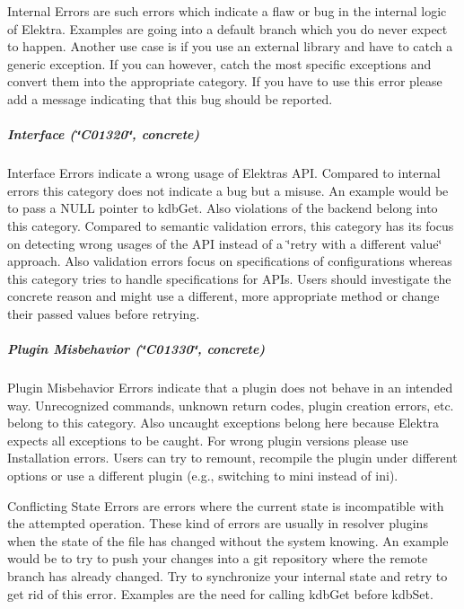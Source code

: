 {\ttfamily Internal Errors} are such errors which indicate a flaw or bug in the internal logic of Elektra. Examples are going into a {\ttfamily default} branch which you do never expect to happen. Another use case is if you use an external library and have to catch a generic exception. If you can however, catch the most specific exceptions and convert them into the appropriate category. If you have to use this error please add a message indicating that this bug should be reported.

\label{invalid_invalid}%
%
\subparagraph*{Interface (\char`\"{}\+C01320\char`\"{}, concrete)}

{\ttfamily Interface Errors} indicate a wrong usage of Elektra\textquotesingle{}s A\+PI. Compared to {\ttfamily internal} errors this category does not indicate a bug but a misuse. An example would be to pass a N\+U\+LL pointer to {\ttfamily kdb\+Get}. Also violations of the backend belong into this category. Compared to semantic validation errors, this category has its focus on detecting wrong usages of the A\+PI instead of a \char`\"{}retry with a
different value\char`\"{} approach. Also validation errors focus on specifications of configurations whereas this category tries to handle specifications for A\+P\+Is. Users should investigate the concrete reason and might use a different, more appropriate method or change their passed values before retrying.

\label{invalid_invalid}%
%
\subparagraph*{Plugin Misbehavior (\char`\"{}\+C01330\char`\"{}, concrete)}

{\ttfamily Plugin Misbehavior Errors} indicate that a plugin does not behave in an intended way. Unrecognized commands, unknown return codes, plugin creation errors, etc. belong to this category. Also uncaught exceptions belong here because Elektra expects all exceptions to be caught. For wrong plugin versions please use {\ttfamily Installation} errors. Users can try to remount, recompile the plugin under different options or use a different plugin (e.\+g., switching to {\ttfamily mini} instead of {\ttfamily ini}).

{\ttfamily Conflicting State Errors} are errors where the current state is incompatible with the attempted operation. These kind of errors are usually in resolver plugins when the state of the file has changed without the system knowing. An example would be to try to push your changes into a git repository where the remote branch has already changed. Try to synchronize your internal state and retry to get rid of this error. Examples are the need for calling {\ttfamily kdb\+Get} before {\ttfamily kdb\+Set}.

